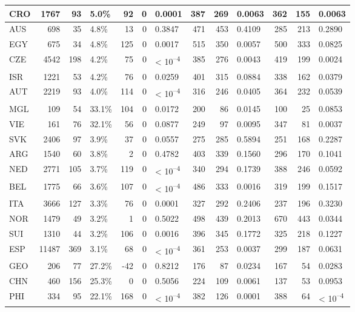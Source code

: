 \begin{tabular}{l|r|r|l|r|r|l|r|r|l|r|r|l}
CRO & 1767 & 93 & 5.0\% & 92 & 0 & 0.0001 & 387 & 269 & 0.0063 & 362 & 155 & 0.0063\\
\hline
AUS & 698 & 35 & 4.8\% & 13 & 0 & 0.3847 & 471 & 453 & 0.4109 & 285 & 213 & 0.2890\\
\hline
EGY & 675 & 34 & 4.8\% & 125 & 0 & 0.0017 & 515 & 350 & 0.0057 & 500 & 333 & 0.0825\\
\hline
CZE & 4542 & 198 & 4.2\% & 75 & 0 & < 10\textsuperscript{--4} & 385 & 276 & 0.0043 & 419 & 199 & 0.0024\\
\hline
ISR & 1221 & 53 & 4.2\% & 76 & 0 & 0.0259 & 401 & 315 & 0.0884 & 338 & 162 & 0.0379\\
\hline
AUT & 2219 & 93 & 4.0\% & 114 & 0 & < 10\textsuperscript{--4} & 316 & 246 & 0.0405 & 364 & 232 & 0.0539\\
\hline
MGL & 109 & 54 & 33.1\% & 104 & 0 & 0.0172 & 200 & 86 & 0.0145 & 100 & 25 & 0.0853\\
\hline
VIE & 161 & 76 & 32.1\% & 56 & 0 & 0.0877 & 249 & 97 & 0.0095 & 347 & 81 & 0.0037\\
\hline
SVK & 2406 & 97 & 3.9\% & 37 & 0 & 0.0557 & 275 & 285 & 0.5894 & 251 & 168 & 0.2287\\
\hline
ARG & 1540 & 60 & 3.8\% & 2 & 0 & 0.4782 & 403 & 339 & 0.1560 & 296 & 170 & 0.1041\\
\hline
NED & 2771 & 105 & 3.7\% & 119 & 0 & < 10\textsuperscript{--4} & 340 & 294 & 0.1739 & 388 & 246 & 0.0592\\
\hline
BEL & 1775 & 66 & 3.6\% & 107 & 0 & < 10\textsuperscript{--4} & 486 & 333 & 0.0016 & 319 & 199 & 0.1517\\
\hline
ITA & 3666 & 127 & 3.3\% & 76 & 0 & 0.0001 & 327 & 292 & 0.2406 & 237 & 196 & 0.3230\\
\hline
NOR & 1479 & 49 & 3.2\% & 1 & 0 & 0.5022 & 498 & 439 & 0.2013 & 670 & 443 & 0.0344\\
\hline
SUI & 1310 & 44 & 3.2\% & 106 & 0 & 0.0016 & 396 & 345 & 0.1772 & 325 & 218 & 0.1227\\
\hline
ESP & 11487 & 369 & 3.1\% & 68 & 0 & < 10\textsuperscript{--4} & 361 & 253 & 0.0037 & 299 & 187 & 0.0631\\
\hline
GEO & 206 & 77 & 27.2\% & -42 & 0 & 0.8212 & 176 & 87 & 0.0234 & 167 & 54 & 0.0283\\
\hline
CHN & 460 & 156 & 25.3\% & 0 & 0 & 0.5056 & 224 & 109 & 0.0061 & 137 & 53 & 0.0953\\
\hline
PHI & 334 & 95 & 22.1\% & 168 & 0 & < 10\textsuperscript{--4} & 382 & 126 & 0.0001 & 388 & 64 & < 10\textsuperscript{--4}\\

\end{tabular}
